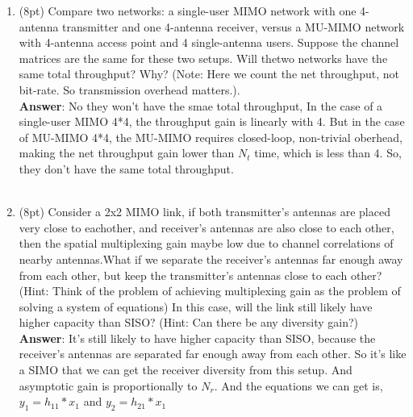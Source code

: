 \documentclass[12pt]{article}
\begin{document}
\begin{enumerate}
\item  (8pt) Compare two networks: a single-user MIMO network with one 4-antenna transmitter
and one 4-antenna receiver, versus a MU-MIMO network with 4-antenna access point and 4
single-antenna users. Suppose the channel matrices are the same for these two setups. Will thetwo networks have the same total throughput? Why? (Note: Here we count the net throughput,
not bit-rate. So transmission overhead matters.).\\
\textbf{Answer}: No they won't have the smae total throughput, In the case of a single-user MIMO 4*4, the throughput gain is linearly with 4. But in the case of MU-MIMO 4*4, the MU-MIMO requires closed-loop, non-trivial oberhead, making the net throughput gain lower than $N_t$ time, which is less than 4. So, they don't have the same total throughput.\\\\

\item  (8pt) Consider a 2x2 MIMO link, if both transmitter’s antennas are placed very close to eachother, and receiver’s antennas are also close to each other, then the spatial multiplexing gain maybe low due to channel correlations of nearby antennas.What if we separate the receiver’s antennas far enough away from each other, but keep the transmitter’s antennas close to each other? (Hint: Think of the problem of achieving multiplexing gain as the problem of solving a system of equations)
In this case, will the link still likely have higher capacity than SISO? (Hint: Can there be any diversity gain?)\\
\textbf{Answer}: It's still likely to have higher capacity than SISO, because the receiver's antennas are separated far enough away from each other. So it's like a SIMO that we can get the receiver diversity from this setup. And asymptotic gain is proportionally to $N_r$.
And the equations we can get is, $y_1 = h_{11}*x_1$ and $y_2 = h_{21}*x_1$
\end{enumerate}
\end{document}
